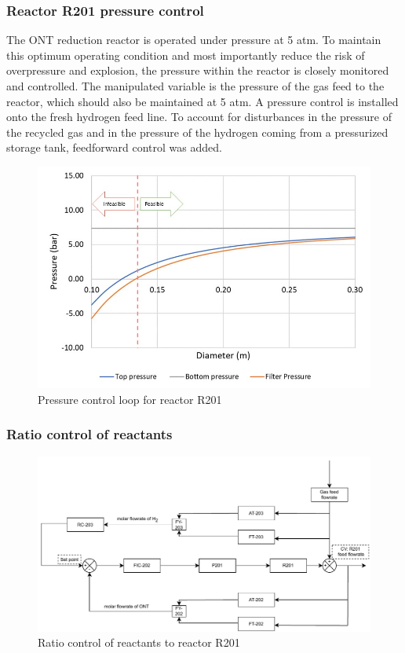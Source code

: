 \subsubsection{Reactor R201 pressure control} %
The ONT reduction reactor is operated under pressure at 5 atm. To maintain this optimum operating condition and most importantly reduce the risk of overpressure and explosion, the pressure within the reactor is closely monitored and controlled. The manipulated variable is the pressure of the gas feed to the reactor, which should also be maintained at 5 atm. A pressure control is installed onto the fresh hydrogen feed line. To account for disturbances in the pressure of the recycled gas and in the pressure of the hydrogen coming from a pressurized storage tank, feedforward control was added. 
\begin{figure}
    \centering
    \includegraphics[width=0.68\linewidth]{chapters/3-separation/figures/diameter.jpg}
    \caption{Pressure control loop for reactor R201}
    \label{fig:R201-PC}
\end{figure}

\subsubsection{Ratio control of reactants} %
\begin{figure}[H]
    \centering
    \includegraphics[width=0.8\linewidth]{chapters/4-operation-control/4-Figures/R201-FC.pdf}
    \caption{Ratio control of reactants to reactor R201}
    \label{fig:R201-FC}
\end{figure} 

